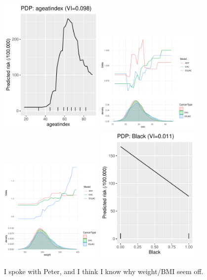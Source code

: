\documentclass[12pt]{article}
\begin{document}
\clearpage
\begin{figure}[h]
\centering
\includegraphics[width=0.45\textwidth]{figures/pdp/ageatindex.pdf}
\includegraphics[width=0.45\textwidth]{figures/pdp/bmi.pdf}
\includegraphics[width=0.45\textwidth]{figures/pdp/weight.pdf}
\includegraphics[width=0.45\textwidth]{figures/pdp/Black.pdf}
\caption{I spoke with Peter, and I think I know why weight/BMI seem off.}
\end{figure}
\end{document}
